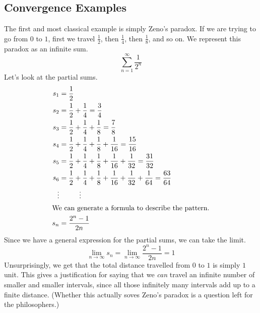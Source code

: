 \documentclass[fleqn]{report}
\begin{document}
\subsection{Convergence Examples}
\label{series-examples}

\begin{example}The first and most classical example is simply
Zeno's paradox. If we are trying to go from $0$ to $1$, first
we travel $\frac{1}{2}$, then $\frac{1}{4}$, then
$\frac{1}{8}$, and so on. We represent this paradox
as an infinite sum. 
\begin{equation*}
\sum_{n=1}^\infty \frac{1}{2^n}
\end{equation*}
Let's look at the partial sums.
\begin{align*}
s_1 & = \frac{1}{2} \\
s_2 & = \frac{1}{2} + \frac{1}{4} = \frac{3}{4} \\
s_3 & = \frac{1}{2} + \frac{1}{4} + \frac{1}{8} = \frac{7}{8} \\
s_4 & = \frac{1}{2} + \frac{1}{4} + \frac{1}{8} + \frac{1}{16} =
\frac{15}{16} \\
s_5 & = \frac{1}{2} + \frac{1}{4} + \frac{1}{8} + \frac{1}{16} +
\frac{1}{32} = \frac{31}{32} \\
s_6 & = \frac{1}{2} + \frac{1}{4} + \frac{1}{8} + \frac{1}{16} +
\frac{1}{32} + \frac{1}{64} = \frac{63}{64} \\
\vdots & \hspace{1cm} \vdots \\
\intertext{We can generate a formula to describe the pattern.}
s_n & = \frac{2^n-1}{2n} 
\end{align*}
Since we have a general expression for the partial sums, we
can take the limit.
\begin{equation*}
\lim_{n \rightarrow \infty} s_n = \lim_{n \rightarrow \infty}
\frac{2^n - 1}{2n} = 1
\end{equation*}
Unsurprisingly, we get that the total distance travelled from
$0$ to $1$ is simply $1$ unit. This gives a justification for
saying that we \emph{can} travel an infinite number of smaller
and smaller intervals, since all those infinitely many
intervals add up to a finite distance. (Whether this actually
soves Zeno's paradox is a question left for the philosophers.) 
\end{example}
\end{document}
